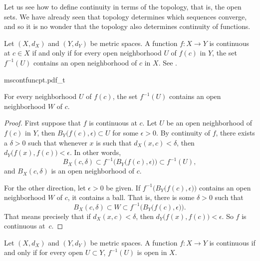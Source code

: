 Let us see how to define continuity in terms of the topology, that is,
the open sets.  We have already seen that topology determines which 
sequences converge, and so it is no wonder that the topology also
determines continuity of functions.

\begin{lemma} \label{lemma:mstopocontloc}
Let $(X,d_X)$ and $(Y,d_Y)$ be metric spaces.
A function $f \colon X \to Y$ is continuous at $c \in X$
if and only if for every open neighborhood $U$ of $f(c)$ in $Y$, the set
$f^{-1}(U)$ contains an open neighborhood of $c$ in $X$.
See .
\end{lemma}

\begin{myfigureht}
{mscontfuncpt.pdf_t}
\caption{For every neighborhood $U$ of $f(c)$, the set $f^{-1}(U)$ contains an open
neighborhood $W$ of $c$.\label{fig:mscontfuncpt}}
\end{myfigureht}

\begin{proof}
First suppose that $f$ is continuous at $c$.
Let $U$ be an open neighborhood of $f(c)$
in $Y$, then $B_Y\bigl(f(c),\epsilon\bigr) \subset U$ for some $\epsilon >
0$.  By continuity of $f$, there exists a $\delta > 0$
such that whenever $x$ is such that $d_X(x,c) < \delta$, then
$d_Y\bigl(f(x),f(c)\bigr) < \epsilon$.  In other words,
\begin{equation*}
B_X(c,\delta) \subset f^{-1}\bigl(B_Y\bigl(f(c),\epsilon\bigr)\bigr) \subset
f^{-1}(U) ,
\end{equation*}
and $B_X(c,\delta)$ is an open neighborhood of $c$.

For the other direction,
let $\epsilon > 0$ be given.  If
$f^{-1}\bigl(B_Y\bigl(f(c),\epsilon\bigr)\bigr)$ contains an open
neighborhood $W$ of $c$, it contains a ball.  That is, there is some $\delta > 0$
such that
\begin{equation*}
B_X(c,\delta) \subset W \subset f^{-1}\bigl(B_Y\bigl(f(c),\epsilon\bigr)\bigr) .
\end{equation*}
That means precisely that if $d_X(x,c) < \delta$,
then $d_Y\bigl(f(x),f(c)\bigr) < \epsilon$.
So $f$ is continuous at~$c$.
\end{proof}

\begin{thm} \label{thm:mstopocont}
Let $(X,d_X)$ and $(Y,d_Y)$ be metric spaces.  A function $f \colon X \to Y$
is continuous if and only if
for every open $U \subset Y$, $f^{-1}(U)$ is open in $X$.
\end{thm}

